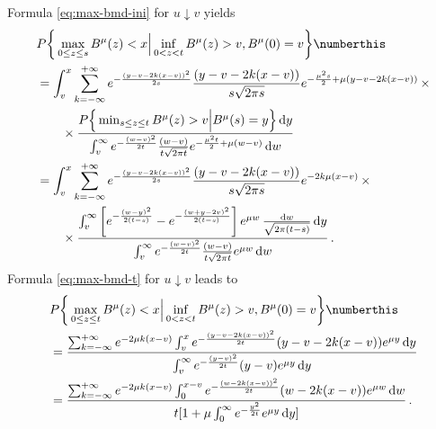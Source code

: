 %
%
Formula \eqref{eq:max-bmd-ini} for $  u \downarrow v $ yields
%
%
\begin{align*}
	&
	P\bigg\{ \max_{0 \leq z \leq s} B^\mu(z)<x \Big |  \inf_{0 < z < t} B^\mu (z) > v, B^\mu(0) = v  \bigg\}
	\numberthis 
	\label{eq:max-bmd-v}
	\\
	&=
		\int_v^x \sum_{k = - \infty}^{+\infty}
			e^{    -   \frac{(y - v - 2k(x-v))^2}{2 s} } 
		\frac { (y - v - 2k (x-v) )}{s\sqrt{2 \pi s}}
		e^{ - \frac{\mu^2 s}{2} + \mu ( y - v- 2k(x-v))}
		\, \times 
		\\
		& \qquad \times 
		\frac{ 
		P\Big\{   \min_{s \leq z \leq t} B^\mu(z)   > v  \Big | B^\mu ( s) = y \Big\}
		\, 	\mathrm d  y
		}{
		\int_v^\infty 
			e^{  - \frac{(w-v)^2}{2t}  } 
		\frac{ (w-v) }{ t \sqrt{2 \pi t } }
		e^{  - \frac{\mu^2 t}{2} + \mu ( w - v)   } \,  \mathrm d  w
	} 
	\\
	&=
	\int_v^x \sum_{k = - \infty}^{+\infty}
		e^{    -   \frac{(y - v - 2k(x-v))^2}{2 s} } 
	\frac { (y - v - 2k (x-v) )}{s\sqrt{2 \pi s }}
	e^{ -2 k \mu (x-v)}
	\, \times 
	\\
	& \qquad \times 
	\frac{ 
		\int_v^\infty
		\left[
			e^{  - \frac{(w - y )^2}{  2 (t-s) }    }
			- 
			e^{  - \frac{  (w + y - 2 v)^2}{ 2 (t-s) }    } 
			\right]
	e^{ \mu w} \, \frac{ \mathrm d w}{\sqrt{2 \pi (t-s)} }
%		
		\,\mathrm d y
	}{
		\int_v^\infty 
			e^{  - \frac{(w-v)^2}{2t}  } 
		\frac { (w-v) }{t \sqrt{2 \pi t } } 
		e^{ \mu w   } \,  \mathrm d w
	} \, .
\end{align*}
%
%
%
Formula \eqref{eq:max-bmd-t} for $  u \downarrow v $ leads to 
%
\begin{align*}
		&
		P\bigg\{ \max_{0 \leq z \leq t} B^\mu(z) <x \Big |  \inf_{0 < z < t} B^\mu (z) > v, B^\mu(0) = v  \bigg\}
		\numberthis 
		\label{eq:max-bmd-t-v}
		\\
		&=
		\frac{  
		\sum_{k = -\infty} ^ { + \infty}
		e^{  - 2 \mu k (x-v)  }
		\int_v^x
			e^ {   -  \frac{(y - v - 2k(x-v))^2}{2t}  }
			(y - v - 2k ( x-v) )
			e^{ \mu y } \, \mathrm d y
		}{
		\int_v^\infty 
		e^{  - \frac{(y - v)^2}{2t}  } (y-v) 
		e^{ \mu y } \,\mathrm d y	
		      }
	    \\
	    &=
	    \frac{  
	    	\sum_{k = -\infty} ^ { + \infty}
	    	e^{  - 2 \mu k (x-v)  }
	    	\int_0^{x-v}
	    	e^ {   -  \frac{(w  - 2k(x-v))^2}{2t}  }
	    	(w- 2k ( x-v) )
	    	e^{ \mu w } \, \mathrm d w
	    }{
	    	t[1 + \mu \int_0^\infty 
	    	e^{  - \frac{y^2}{2t}  } 
	    	e^{ \mu y } \,\mathrm d y]	
	    } \, .
\end{align*}

